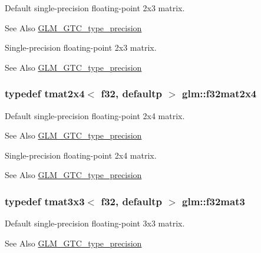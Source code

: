 Default single-\/precision floating-\/point 2x3 matrix. \begin{DoxySeeAlso}{See Also}
\hyperlink{group__gtc__type__precision}{G\-L\-M\-\_\-\-G\-T\-C\-\_\-type\-\_\-precision}
\end{DoxySeeAlso}
Single-\/precision floating-\/point 2x3 matrix. \begin{DoxySeeAlso}{See Also}
\hyperlink{group__gtc__type__precision}{G\-L\-M\-\_\-\-G\-T\-C\-\_\-type\-\_\-precision} 
\end{DoxySeeAlso}
\hypertarget{group__gtc__type__precision_gab0eab14575c18077fd3415539bce685a}{
\subsubsection[{f32mat2x4}]{\setlength{\rightskip}{0pt plus 5cm}typedef tmat2x4$<$ f32, defaultp $>$ {\bf glm\-::f32mat2x4}}}\label{group__gtc__type__precision_gab0eab14575c18077fd3415539bce685a}
Default single-\/precision floating-\/point 2x4 matrix. \begin{DoxySeeAlso}{See Also}
\hyperlink{group__gtc__type__precision}{G\-L\-M\-\_\-\-G\-T\-C\-\_\-type\-\_\-precision}
\end{DoxySeeAlso}
Single-\/precision floating-\/point 2x4 matrix. \begin{DoxySeeAlso}{See Also}
\hyperlink{group__gtc__type__precision}{G\-L\-M\-\_\-\-G\-T\-C\-\_\-type\-\_\-precision} 
\end{DoxySeeAlso}
\hypertarget{group__gtc__type__precision_ga5fbaec59b220964f59403bb362b5f93e}{
\subsubsection[{f32mat3}]{\setlength{\rightskip}{0pt plus 5cm}typedef tmat3x3$<$ f32, defaultp $>$ {\bf glm\-::f32mat3}}}\label{group__gtc__type__precision_ga5fbaec59b220964f59403bb362b5f93e}
Default single-\/precision floating-\/point 3x3 matrix. \begin{DoxySeeAlso}{See Also}
\hyperlink{group__gtc__type__precision}{G\-L\-M\-\_\-\-G\-T\-C\-\_\-type\-\_\-precision}
\end{DoxySeeAlso}

